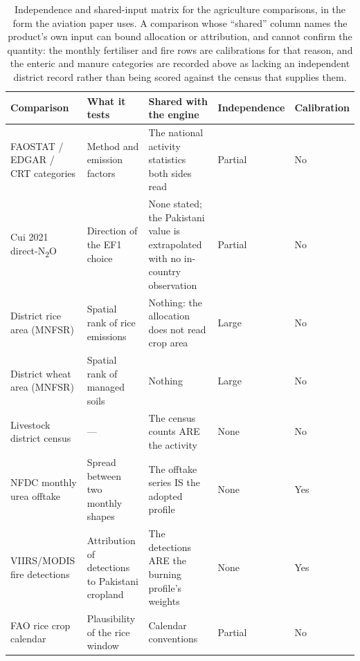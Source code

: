 \begin{table}[!htbp]
\centering
\footnotesize
\begin{tabular}{@{}p{}p{}p{}p{}p{}@{}}
\toprule
\textbf{Comparison} & \textbf{What it tests} & \textbf{Shared with the engine} &
\textbf{Independence} & \textbf{Calibration} \\
\midrule
FAOSTAT / EDGAR / CRT categories & Method and emission factors & The national activity
statistics both sides read & Partial & No \\
Cui 2021 direct-N\textsubscript{2}O & Direction of the EF1 choice & None stated; the
Pakistani value is extrapolated with no in-country observation & Partial & No \\
District rice area (MNFSR) & Spatial rank of rice emissions & Nothing: the allocation does
not read crop area & Large & No \\
District wheat area (MNFSR) & Spatial rank of managed soils & Nothing & Large & No \\
Livestock district census & --- & The census counts ARE the activity & None & No \\
NFDC monthly urea offtake & Spread between two monthly shapes & The offtake series IS the
adopted profile & None & Yes \\
VIIRS/MODIS fire detections & Attribution of detections to Pakistani cropland & The
detections ARE the burning profile's weights & None & Yes \\
FAO rice crop calendar & Plausibility of the rice window & Calendar conventions & Partial &
No \\
\bottomrule
\end{tabular}
\caption{Independence and shared-input matrix for the agriculture comparisons, in the form
the aviation paper uses. A comparison whose ``shared'' column names the product's own input
can bound allocation or attribution, and cannot confirm the quantity: the monthly fertiliser
and fire rows are calibrations for that reason, and the enteric and manure categories are
recorded above as lacking an independent district record rather than being scored against
the census that supplies them.}
\label{tab:agri-independence}
\end{table}
